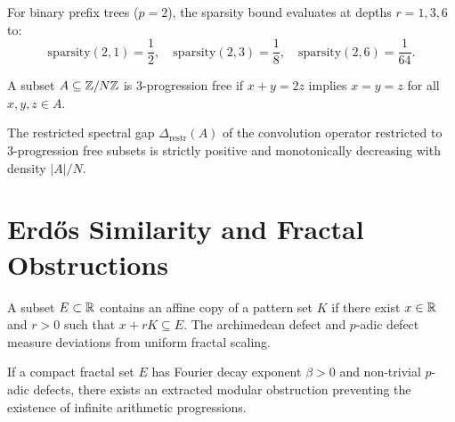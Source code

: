 \begin{theorem}
\label{thm:sparsity_bounds}
\leanok
For binary prefix trees ($p=2$), the sparsity bound evaluates at depths $r=1, 3, 6$ to:
\[
\mathrm{sparsity}(2, 1) = \frac{1}{2}, \quad \mathrm{sparsity}(2, 3) = \frac{1}{8}, \quad \mathrm{sparsity}(2, 6) = \frac{1}{64}.
\]
\end{theorem}

\begin{definition}
\label{def:progression_free_sets}
\leanok
A subset $A \subseteq \mathbb{Z} / N \mathbb{Z}$ is 3-progression free if $x + y = 2z$ implies $x = y = z$ for all $x, y, z \in A$.
\end{definition}

\begin{theorem}
\label{thm:restricted_spectral_gap}
\leanok
The restricted spectral gap $\Delta_{\mathrm{restr}}(A)$ of the convolution operator restricted to 3-progression free subsets is strictly positive and monotonically decreasing with density $|A|/N$.
\end{theorem}

\section{Erd\H{o}s Similarity and Fractal Obstructions}

\begin{definition}
\label{def:erdos_similarity}
\leanok
A subset $E \subset \mathbb{R}$ contains an affine copy of a pattern set $K$ if there exist $x \in \mathbb{R}$ and $r > 0$ such that $x + r K \subseteq E$. The archimedean defect and $p$-adic defect measure deviations from uniform fractal scaling.
\end{definition}

\begin{theorem}
\label{thm:extract_modular_obstruction}
\leanok
If a compact fractal set $E$ has Fourier decay exponent $\beta > 0$ and non-trivial $p$-adic defects, there exists an extracted modular obstruction preventing the existence of infinite arithmetic progressions.
\end{theorem}

